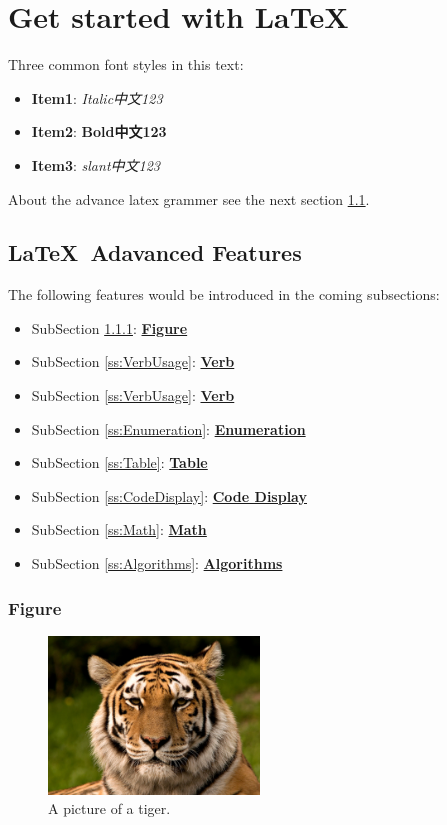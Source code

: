 \chapter{Get started with \LaTeX\ }
\label{c:GetStarted}
Three common font styles in this text: 
\begin{itemize}
    \item \textbf{Item1}: \textit{Italic中文123}     
    \item \textbf{Item2}: \textbf{Bold中文123}
    \item \textbf{Item3}: \textsl{slant中文123}
\end{itemize}

About the advance latex grammer see the next section \ref{s:AdvancedFeatures}.


\section{\LaTeX\ Adavanced Features}
\label{s:AdvancedFeatures}
The following features would be introduced in the coming subsections:
\begin{itemize}
    \item SubSection \ref{ss:Figure}: \hyperref[ss:Figure]{\textbf{Figure}}
    \item SubSection \ref{ss:VerbUsage}: \hyperref[ss:VerbUsage]{\textbf{Verb}}
    \item SubSection \ref{ss:VerbUsage}: \hyperref[ss:VerbUsage]{\textbf{Verb}}
    \item SubSection \ref{ss:Enumeration}: \hyperref[ss:Enumeration]{\textbf{Enumeration}}
    \item SubSection \ref{ss:Table}: \hyperref[ss:Table]{\textbf{Table}}
    \item SubSection \ref{ss:CodeDisplay}: \hyperref[ss:CodeDisplay]{\textbf{Code Display}}
    \item SubSection \ref{ss:Math}: \hyperref[ss:Math]{\textbf{Math}}
    \item SubSection \ref{ss:Algorithms}: \hyperref[ss:Algorithms]{\textbf{Algorithms}}
\end{itemize}

\subsection{Figure}
\label{ss:Figure}
\begin{figure}[htpb!]
  \centering
    \includegraphics[width=0.5\textwidth]{fig/tiger.jpeg}
    \caption{\label{fig:tiger}A picture of a tiger.}
\end{figure}

